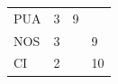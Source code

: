 \begin{table}[H]
\begin{center}
\begin{tabular}{llll}
PUA                                 & 3                                  & 9                                 &                                     \\
NOS                                 & 3                                  &                                   & 9                                   \\
CI                                  & 2                                  &                                   & 10                                 
\end{tabular}
\end{center}
\end{table}